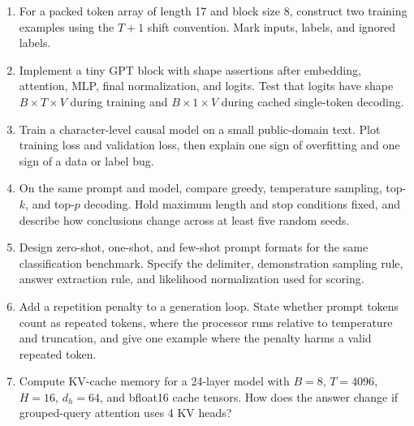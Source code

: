 \begin{enumerate}
\item For a packed token array of length 17 and block size 8, construct two training examples using the $T+1$ shift convention. Mark inputs, labels, and ignored labels.
\item Implement a tiny GPT block with shape assertions after embedding, attention, MLP, final normalization, and logits. Test that logits have shape $B \times T \times V$ during training and $B \times 1 \times V$ during cached single-token decoding.
\item Train a character-level causal model on a small public-domain text. Plot training loss and validation loss, then explain one sign of overfitting and one sign of a data or label bug.
\item On the same prompt and model, compare greedy, temperature sampling, top-$k$, and top-$p$ decoding. Hold maximum length and stop conditions fixed, and describe how conclusions change across at least five random seeds.
\item Design zero-shot, one-shot, and few-shot prompt formats for the same classification benchmark. Specify the delimiter, demonstration sampling rule, answer extraction rule, and likelihood normalization used for scoring.
\item Add a repetition penalty to a generation loop. State whether prompt tokens count as repeated tokens, where the processor runs relative to temperature and truncation, and give one example where the penalty harms a valid repeated token.
\item Compute KV-cache memory for a 24-layer model with $B=8$, $T=4096$, $H=16$, $d_h=64$, and bfloat16 cache tensors. How does the answer change if grouped-query attention uses 4 KV heads?
\end{enumerate}
